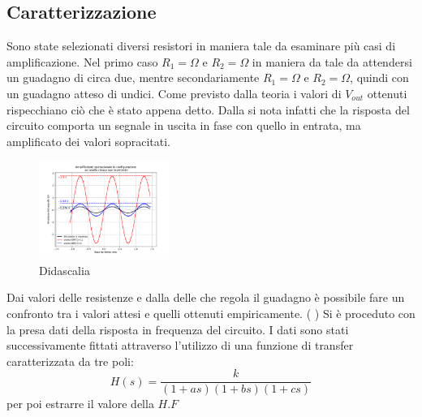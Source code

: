 \documentclass[journal]{IEEEtran}
\begin{document}
\subsection{\textbf{Caratterizzazione}}
Sono state selezionati diversi resistori in maniera tale da esaminare più casi di amplificazione. Nel primo caso $R_1=\Omega$ e $R_2=\Omega$ in maniera da tale da attendersi un guadagno di circa due, mentre secondariamente $R_1=\Omega$ e $R_2=\Omega$, quindi con un guadagno atteso di undici. Come previsto dalla teoria i valori di $V_{out}$ ottenuti rispecchiano ciò che è stato appena detto. Dalla  si nota infatti che la risposta del circuito comporta un segnale in uscita in fase con quello in entrata, ma amplificato dei valori sopracitati.
\begin{figure}[H]%
\begin {center}
\includegraphics[width=0.38\textwidth]{analysis/output/OPA-closed-loop-non-inv-G2-11.pdf}
\caption{Didascalia}
\label{fig:oscilloscope}
\end {center}
\end{figure}
Dai valori delle resistenze e dalla delle che regola il guadagno è possibile fare un confronto tra i valori attesi e quelli ottenuti empiricamente. (  )
Si è proceduto con la presa dati della risposta in frequenza del circuito. I dati sono stati successivamente fittati attraverso l'utilizzo di una funzione di transfer caratterizzata da tre poli:
\[H(s)=\frac{k}{(1+as)(1+bs)(1+cs)}\] 
per poi estrarre il valore della $H.F$
\end{document}
